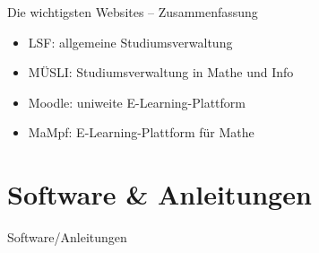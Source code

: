 \begin{frame}{Die wichtigsten Websites -- Zusammenfassung}
    \begin{itemize}
        \item LSF: allgemeine Studiumsverwaltung
        \item MÜSLI: Studiumsverwaltung in Mathe und Info
        \item Moodle: uniweite E-Learning-Plattform
        \item MaMpf: E-Learning-Plattform für Mathe
    \end{itemize}
\end{frame}


\section{Software \& Anleitungen}
\begin{frame}{Software/Anleitungen}
\end{frame}


